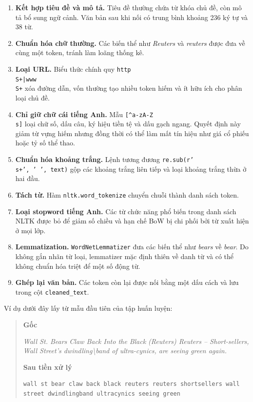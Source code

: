 \documentclass[12pt]{hcmut-report}
\begin{document}
\begin{enumerate}[leftmargin=2em,itemsep=5pt]
  \item \textbf{Kết hợp tiêu đề và mô tả.} Tiêu đề thường chứa từ khóa chủ đề, còn mô tả bổ sung ngữ cảnh. Văn bản sau khi nối có trung bình khoảng 236 ký tự và 38 từ.
  \item \textbf{Chuẩn hóa chữ thường.} Các biến thể như \textit{Reuters} và \textit{reuters} được đưa về cùng một token, tránh làm loãng thống kê.
  \item \textbf{Loại URL.} Biểu thức chính quy \texttt{http\string\\S+|www\string\\S+} xóa đường dẫn, vốn thường tạo nhiều token hiếm và ít hữu ích cho phân loại chủ đề.
  \item \textbf{Chỉ giữ chữ cái tiếng Anh.} Mẫu \texttt{[\string^a-zA-Z\string\\s]} loại chữ số, dấu câu, ký hiệu tiền tệ và dấu gạch ngang. Quyết định này giảm từ vựng hiếm nhưng đồng thời có thể làm mất tín hiệu như giá cổ phiếu hoặc tỷ số thể thao.
  \item \textbf{Chuẩn hóa khoảng trắng.} Lệnh tương đương \texttt{re.sub(r'\string\\s+', ' ', text)} gộp các khoảng trắng liên tiếp và loại khoảng trắng thừa ở hai đầu.
  \item \textbf{Tách từ.} Hàm \texttt{nltk.word\_tokenize} chuyển chuỗi thành danh sách token.
  \item \textbf{Loại stopword tiếng Anh.} Các từ chức năng phổ biến trong danh sách NLTK được bỏ để giảm số chiều và hạn chế BoW bị chi phối bởi từ xuất hiện ở mọi lớp.
  \item \textbf{Lemmatization.} \texttt{WordNetLemmatizer} đưa các biến thể như \textit{bears} về \textit{bear}. Do không gắn nhãn từ loại, lemmatizer mặc định thiên về danh từ và có thể không chuẩn hóa triệt để một số động từ.
  \item \textbf{Ghép lại văn bản.} Các token còn lại được nối bằng một dấu cách và lưu trong cột \texttt{cleaned\_text}.
\end{enumerate}

Ví dụ dưới đây lấy từ mẫu đầu tiên của tập huấn luyện:

\begin{quote}\small
\setlength{\fboxsep}{7pt}
\noindent\colorbox{ucRule!12}{%
  \parbox{\dimexpr\linewidth-2\fboxsep\relax}{%
    \raggedright
    \textbf{\textcolor{ucRule!85!black}{Gốc}}\par
    \textit{Wall St. Bears Claw Back Into the Black (Reuters) Reuters -- Short-sellers, Wall Street's dwindling\textbackslash band of ultra-cynics, are seeing green again.}%
  }%
}
\par\vspace{5pt}
\noindent\colorbox{ucRule!12}{%
  \parbox{\dimexpr\linewidth-2\fboxsep\relax}{%
    \raggedright
    \textbf{\textcolor{ucRule!85!black}{Sau tiền xử lý}}\par
    \texttt{wall st bear claw back black reuters reuters shortsellers wall street dwindlingband ultracynics seeing green}%
  }%
}
\end{quote}
\end{document}
